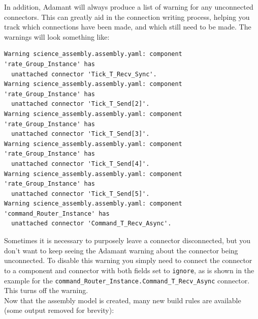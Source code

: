 In addition, Adamant will always produce a list of warning for any unconnected connectors. This can greatly aid in the connection writing process, helping you track which connections have been made, and which still need to be made. The warnings will look something like:

\vspace{5mm} %
\begin{verbatim}
Warning science_assembly.assembly.yaml: component 'rate_Group_Instance' has 
  unattached connector 'Tick_T_Recv_Sync'.
Warning science_assembly.assembly.yaml: component 'rate_Group_Instance' has 
  unattached connector 'Tick_T_Send[2]'.
Warning science_assembly.assembly.yaml: component 'rate_Group_Instance' has 
  unattached connector 'Tick_T_Send[3]'.
Warning science_assembly.assembly.yaml: component 'rate_Group_Instance' has 
  unattached connector 'Tick_T_Send[4]'.
Warning science_assembly.assembly.yaml: component 'rate_Group_Instance' has 
  unattached connector 'Tick_T_Send[5]'.
Warning science_assembly.assembly.yaml: component 'command_Router_Instance' has 
  unattached connector 'Command_T_Recv_Async'.
\end{verbatim}
\vspace{5mm} %

Sometimes it is necessary to purposely leave a connector disconnected, but you don't want to keep seeing the Adamant warning about the connector being unconnected. To disable this warning you simply need to connect the connector to a component and connector with both fields set to \texttt{ignore}, as is shown in the example for the \texttt{command\_Router\_Instance.Command\_T\_Recv\_Async} connector. This turns off the warning. \\

Now that the assembly model is created, many new build rules are available (some output removed for brevity):

